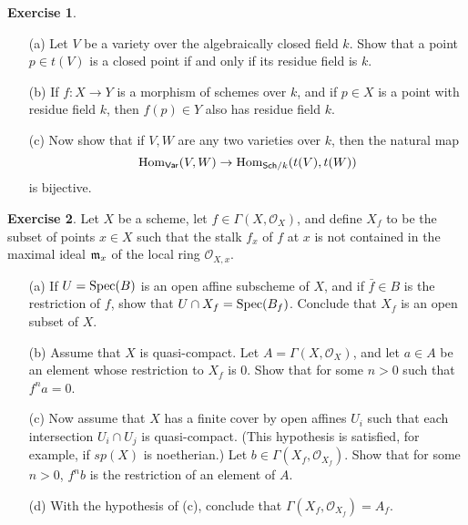 \documentclass[11pt]{book}
\theoremstyle{definition}
\newtheorem{exercise}{Exercise}[section]
\begin{document}
\begin{exercise}
\mbox{}
\begin{itemize}
\item[(a)] Let $V$ be a variety over the algebraically closed field $k$. Show that a point $p\in t(V)$ is a closed point if and only if its residue field is $k$.
\item[(b)] If $f:X\to Y$ is a morphism of schemes over $k$, and if $p\in X$ is a point with residue field $k$, then $f(p)\in Y$ also has residue field $k$.
\item[(c)] Now show that if $V,W$ are any two varieties over $k$, then the natural map 
\[\mathrm{Hom}_{\mathsf{Var}}(V,W)\to\mathrm{Hom}_{\mathsf{Sch}/k}(t(V),t(W))\]
is bijective.
\end{itemize}
\end{exercise}
\begin{exercise}\label{Scheme X_f global section prop}
Let $X$ be a scheme, let $f\in\Gamma(X,\mathscr{O}_X)$, and define $X_f$ to be the subset of points $x\in X$ such that the stalk $f_x$ of $f$ at $x$ is not contained in the maximal ideal $\mathfrak{m}_x$ of the local ring $\mathscr{O}_{X,x}$.
\begin{itemize}
\item[(a)] If $U=\mathrm{Spec}(B)$ is an open affine subscheme of $X$, and if $\bar{f}\in B$ is the restriction of $f$, show that $U\cap X_f=\mathrm{Spec}(B_f)$. Conclude that $X_f$ is an open subset of $X$.
\item[(b)] Assume that $X$ is quasi-compact. Let $A=\Gamma(X,\mathscr{O}_X)$, and let $a\in A$ be an element whose restriction to $X_f$ is $0$. Show that for some $n>0$ such that $f^na=0$.
\item[(c)] Now assume that $X$ has a finite cover by open affines $U_i$ such that each intersection $U_i\cap U_j$ is quasi-compact. (This hypothesis is satisfied, for example, if $sp(X)$ is noetherian.) Let $b\in\Gamma(X_f,\mathscr{O}_{X_f})$. Show that for some $n>0$, $f^nb$ is
the restriction of an element of $A$.
\item[(d)] With the hypothesis of (c), conclude that $\Gamma(X_f,\mathscr{O}_{X_f})=A_f$.
\end{itemize}
\end{exercise}
\end{document}
